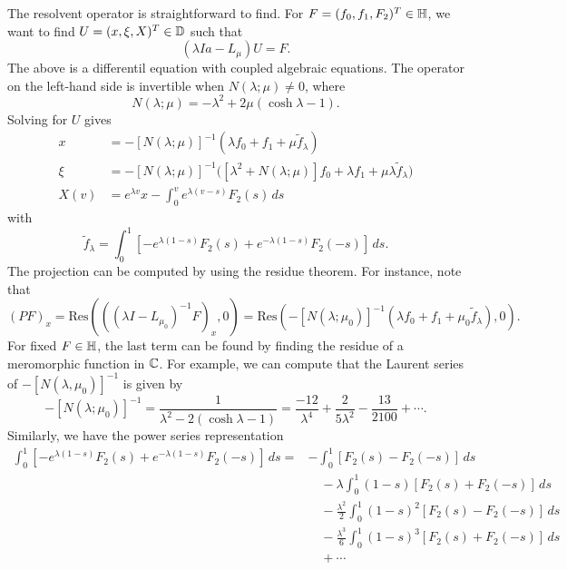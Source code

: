 The resolvent operator is straightforward to find. For \(F=(f_0,f_1,F_2)^T\in\mathbb{H}\), we want to find \(U = (x,\xi, X)^T\in \mathbb{D}\) such that
\begin{equation*}
	(\lambda I a- L_\mu) U = F.
\end{equation*}
The above is a differentil equation with coupled algebraic equations. The operator on the left-hand side is invertible when \(N(\lambda ;\mu) \neq 0\), where 
\begin{equation*}
	N(\lambda;\mu) = - \lambda^2 + 2\mu(\cosh \lambda - 1).
\end{equation*}
Solving for \(U\) gives
\begin{align*}
	x &= -[N(\lambda;\mu)]^{-1}(\lambda f_0 + f_1 + \mu\tilde f_\lambda) \\
	\xi &= -[N(\lambda;\mu)]^{-1} \Big( [\lambda^2 + N(\lambda;\mu)]f_0 + \lambda f_1 + \mu\lambda \tilde f_\lambda \Big) \\
	X(v) &= e^{\lambda v}x - \int_0^v e^{\lambda(v-s)} F_2(s)\, ds
\end{align*}
with 
\begin{equation*}
	\tilde f_\lambda = \int_0^1 [-e^{\lambda(1-s)} F_2(s) + e^{-\lambda (1-s)} F_2(-s)]\, ds.
\end{equation*}
The projection can be computed by using the residue theorem. For instance, note that 
\begin{equation*}
	(PF)_x = \mathrm{Res}(((\lambda  I - L_{\mu_0})^{-1} F)_x, 0) = \mathrm{Res}(-[N(\lambda;\mu_0)]^{-1}(\lambda f_0 + f_1 + \mu_0\tilde f_\lambda), 0).
\end{equation*}
For fixed \(F\in\mathbb{H}\), the last term can be found by finding the residue of a meromorphic function in \(\mathbb{C}\). For example, we can compute that the Laurent series of \(-[N(\lambda,\mu_0)]^{-1}\) is given by
\begin{equation*}
	-[N(\lambda;\mu_0)]^{-1} = \frac  1 {\lambda^2 - 2(\cosh\lambda - 1)} = \frac{-12}{\lambda^4} + \frac{2}{5\lambda^2} - \frac{13}{2100} + \cdots.
\end{equation*}
Similarly, we have the power series representation
\begin{equation*}
	\begin{aligned}
		\int_0^1[-e^{\lambda(1-s) } F_2(s) + e^{-\lambda (1-s)} F_2(-s)]\, ds = &- \int_0^1[F_2(s) - F_2(-s)] \, ds \\
		&\quad - \lambda  \int_0^1 (1-s)[F_2(s) + F_2(-s)]\, ds \\
		&\quad - \frac{\lambda^2}{2} \int_0^1 (1-s)^2[F_2(s) - F_2(-s)]\, ds \\
		&\quad - \frac{\lambda^3}{6} \int_0^1 (1-s)^3[F_2(s) + F_2(-s)]\, ds \\
		&\quad + \cdots
	\end{aligned}
\end{equation*}
